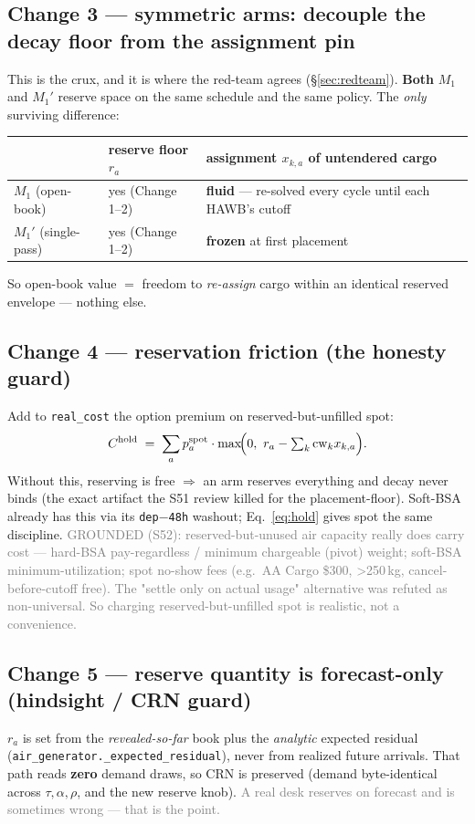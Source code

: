 \documentclass[11pt]{article}
\newcommand{\cw}{\mathrm{cw}}
\newcommand{\resv}{r}
\newcommand{\code}[1]{\texttt{#1}}
\newcommand{\note}[1]{\textcolor{gray}{\small #1}}
\begin{document}
\subsection{Change 3 --- symmetric arms: decouple the decay floor from the assignment pin}
This is the crux, and it is where the red-team agrees (\S\ref{sec:redteam}). \textbf{Both} $M_1$ and $M_1'$
reserve space on the same schedule and the same policy. The \emph{only} surviving difference:
\begin{center}
\begin{tabular}{@{}lll@{}}
\toprule
& reserve floor $\resv_a$ & assignment $x_{k,a}$ of untendered cargo \\
\midrule
$M_1$ (open-book) & yes (Change 1--2) & \textbf{fluid} --- re-solved every cycle until each HAWB's cutoff \\
$M_1'$ (single-pass) & yes (Change 1--2) & \textbf{frozen} at first placement \\
\bottomrule
\end{tabular}
\end{center}
So open-book value $=$ freedom to \emph{re-assign} cargo within an identical reserved envelope --- nothing else.

\subsection{Change 4 --- reservation friction (the honesty guard)}
Add to \code{real\_cost} the option premium on reserved-but-unfilled spot:
\begin{equation}\label{eq:hold}
C^{\mathrm{hold}} \;=\; \sum_a p^{\mathrm{spot}}_a\cdot \max\!\Bigl(0,\ \resv_a-\textstyle\sum_k \cw_k x_{k,a}\Bigr).
\end{equation}
Without this, reserving is free $\Rightarrow$ an arm reserves everything and decay never binds (the exact
artifact the S51 review killed for the placement-floor). Soft-BSA already has this via its \code{dep$-$48h}
washout; Eq.~\eqref{eq:hold} gives spot the same discipline.
\note{GROUNDED (S52): reserved-but-unused air capacity really does carry cost --- hard-BSA pay-regardless
/ minimum chargeable (pivot) weight; soft-BSA minimum-utilization; spot no-show fees (e.g.\ AA Cargo
\$300, >250\,kg, cancel-before-cutoff free). The "settle only on actual usage" alternative was refuted as
non-universal. So charging reserved-but-unfilled spot is realistic, not a convenience.}

\subsection{Change 5 --- reserve quantity is forecast-only (hindsight / CRN guard)}
$\resv_a$ is set from the \emph{revealed-so-far} book plus the \emph{analytic} expected residual
(\code{air\_generator.\_expected\_residual}), never from realized future arrivals. That path reads
\textbf{zero} demand draws, so CRN is preserved (demand byte-identical across $\tau,\alpha,\rho$, and the
new reserve knob). \note{A real desk reserves on forecast and is sometimes wrong --- that is the point.}
\end{document}
